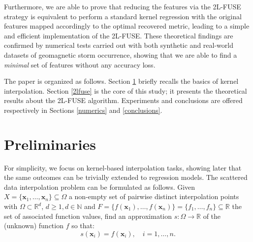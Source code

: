 \documentclass[hyphens,a4paper,11pt]{article}
\begin{document}
Furthermore, we are able to prove that reducing the features via the 2L-FUSE strategy is equivalent to perform a standard kernel regression with the original features mapped accordingly to the optimal recovered metric, leading to a simple and efficient implementation of the 2L-FUSE.  
These theoretical findings are confirmed by numerical tests carried out with both synthetic and real-world datasets of geomagnetic storm occurrence, showing that we are able to find a \emph{minimal} set of features without any accuracy loss. 

The paper is organized as follows. Section \ref{Preliminari} briefly recalls the basics of kernel interpolation. Section \ref{2lfuse} is the core of this study; it presents the theoretical results about the 2L-FUSE algorithm. Experiments and conclusions are offered respectively in Sections \ref{numerics} and \ref{conclusions}.


\section{Preliminaries}
\label{Preliminari}

For simplicity, we focus on kernel-based interpolation tasks, showing later that the same outcomes can be trivially extended to regression models.  
The scattered data interpolation problem can be formulated as follows. Given $X = \{ \boldsymbol{x}_1,\ldots,\boldsymbol{x}_n \} \subseteq \Omega$ a non-empty set of pairwise distinct interpolation points with $\Omega \subset \mathbb{R}^d$, $d \geq 1, d \in \mathbb{N}$ and $F =  \{f(\boldsymbol{x}_1), \ldots, f(\boldsymbol{x}_n)\}=\{f_1,\ldots,f_n\} \subseteq \mathbb{R}$ the set of  associated function values, find an approximation $s:\Omega \longrightarrow \mathbb{R}$ of the (unknown) function $f$ so that: 
\begin{equation}\label{interp_cond}
    s(\boldsymbol{x}_i) = f(\boldsymbol{x}_i), \quad i=1,\ldots,n. 
\end{equation}
\end{document}
